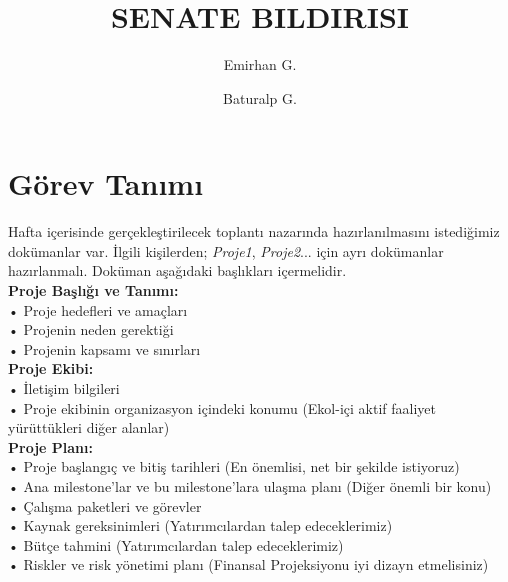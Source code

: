 \documentclass{qjmam}
\renewcommand{\.}{\raisebox{.9mm}{.}}
\begin{document}
\title[{surface~tension~effects~in~a~wedge}] {SENATE BILDIRISI}


\author[bıldırı] {Emirhan G.\and Baturalp G.}




\maketitle

\eqnobysec

\begin{abstract} 

\end{abstract}


\section{Görev Tanımı}
Hafta içerisinde gerçekleştirilecek toplantı nazarında hazırlanılmasını istediğimiz dokümanlar var. İlgili kişilerden; \textit{Proje1}, \textit{Proje2}... için ayrı dokümanlar hazırlanmalı. Doküman aşağıdaki başlıkları içermelidir. \\

\textbf{Proje Başlığı ve Tanımı:} \\
• Proje hedefleri ve amaçları \\
• Projenin neden gerektiği \\
• Projenin kapsamı ve sınırları \\

\textbf{Proje Ekibi:}\\
• İletişim bilgileri\\
• Proje ekibinin organizasyon içindeki konumu (Ekol-içi aktif faaliyet yürüttükleri diğer alanlar)\\

\textbf{Proje Planı:}\\
• Proje başlangıç ve bitiş tarihleri (En önemlisi, net bir şekilde istiyoruz)\\
• Ana milestone'lar ve bu milestone'lara ulaşma planı (Diğer önemli bir konu)\\
• Çalışma paketleri ve görevler\\
• Kaynak gereksinimleri (Yatırımcılardan talep edeceklerimiz)\\
• Bütçe tahmini (Yatırımcılardan talep edeceklerimiz)\\
• Riskler ve risk yönetimi planı (Finansal Projeksiyonu iyi dizayn etmelisiniz)\\
\end{document}
